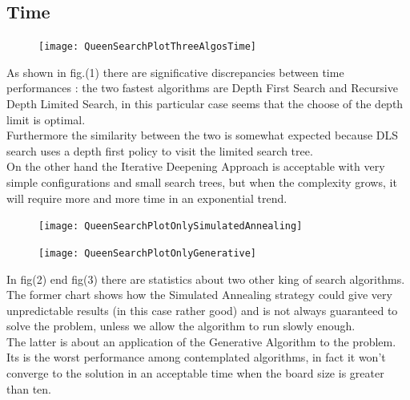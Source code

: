 \documentclass{article}
\begin{document}
					\subsection{Time}
					\begin{center}
\begin{figure}
\centering
\texttt{[image: QueenSearchPlotThreeAlgosTime]}
\caption{}
\label{fig:1}
\end{figure}
\end{center}

As shown in fig.(1) there are significative discrepancies between time performances :  the two fastest algorithms are Depth First Search and Recursive Depth Limited Search, in this particular case seems that the choose of the depth limit is optimal.\\
Furthermore the similarity between the two is somewhat expected because DLS search uses a depth first policy to visit the limited search tree.\medskip\\
On the other hand the Iterative Deepening Approach is acceptable with very simple configurations and small search trees, but when the complexity grows, it will require more and more time in an exponential trend.\medskip\\

\begin{center}
\begin{figure}
\centering
\texttt{[image: QueenSearchPlotOnlySimulatedAnnealing]}
\caption{}
\label{fig:2}
\end{figure}
\end{center}

\begin{center}
\begin{figure}
\centering
\texttt{[image: QueenSearchPlotOnlyGenerative]}
\caption{}
\label{fig:3}
\end{figure}
\end{center}

In fig(2) end fig(3) there are statistics about two other king of search algorithms. The former chart shows how the Simulated Annealing strategy could give very unpredictable results (in this case rather good) and is not always guaranteed to solve the problem, unless we allow the algorithm to run slowly enough.\medskip\\
The latter is about an application of the Generative Algorithm to the problem. Its is the worst performance among contemplated algorithms, in fact it won't converge to the solution in an acceptable time when the board size is greater than ten.
\end{document}
